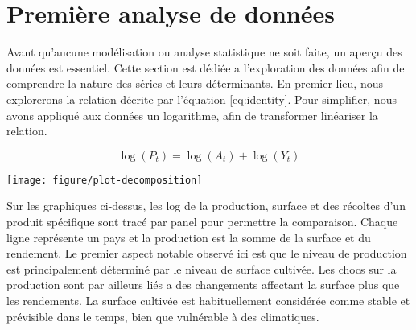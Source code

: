 \documentclass[nojss]{jss}\usepackage{graphicx, color}
\newenvironment{knitrout}{}{} %
\begin{document}
\section{Premi\`{e}re analyse de donn\'{e}es}




Avant qu'aucune mod\'{e}lisation ou analyse statistique ne soit faite,
un aper\c{c}u des donn\'{e}es est essentiel. Cette section est
d\'{e}di\'{e}e a l'exploration des donn\'{e}es afin de comprendre la
nature des s\'{e}ries et leurs d\'{e}terminants. En premier lieu, nous
explorerons la relation d\'{e}crite par l'\'{e}quation
\ref{eq:identity}. Pour simplifier, nous avons appliqu\'{e} aux
donn\'{e}es un logarithme, afin de transformer lin\'{e}ariser la
relation.

\begin{equation}
  \label{eq:logIdentity}
  \log(P_t) = \log(A_t) + \log(Y_t)
\end{equation}



















\begin{knitrout}
\color{fgcolor}

{\centering \texttt{[image: figure/plot-decomposition]} 

}



\end{knitrout}



Sur les graphiques ci-dessus, les log de la production, surface et des
r\'{e}coltes d'un produit sp\'{e}cifique sont trac\'{e} par panel pour
permettre la comparaison. Chaque ligne repr\'{e}sente un pays et la
production est la somme de la surface et du rendement. Le premier
aspect notable observ\'{e} ici est que le niveau de production est
principalement d\'{e}termin\'{e} par le niveau de surface
cultiv\'{e}e. Les chocs sur la production sont par ailleurs li\'{e}s a
des changements affectant la surface plus que les rendements. La
surface cultiv\'{e}e est habituellement consid\'{e}r\'{e}e comme
stable et pr\'{e}visible dans le temps, bien que vuln\'{e}rable \`{a}
des climatiques.
\end{document}
